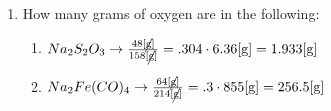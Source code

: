 \documentclass[12pt]{article}
\begin{document}
\begin{enumerate}
\begin{enumerate}
    \end{enumerate}

  \item How many grams of oxygen are in the following:

    \begin{enumerate}

      \item $Na_2S_2O_3\rightarrow\frac{48[\cancel{\si{\gram}}]}{158[\cancel{\si{\gram}}]}=.304\cdot6.36[\si{\gram}]=1.933[\si{\gram}]$

      \item $Na_2Fe(CO)_4\rightarrow\frac{64[\cancel{\si{\gram}}]}{214[\cancel{\si{\gram}}]}=.3\cdot855[\si{\gram}]=256.5[\si{\gram}]$

    \end{enumerate}

\end{enumerate}
\end{document}
